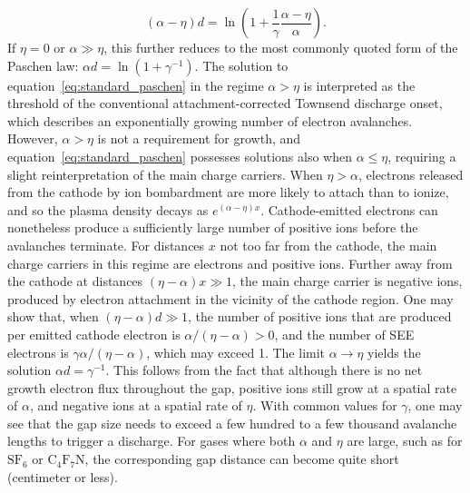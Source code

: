 \documentclass{iopjournal}
\begin{document}
\begin{equation}
  (\alpha-\eta)d = \ln\left(1 + \frac{1}{\gamma}\frac{\alpha-\eta}{\alpha}\right).
\end{equation}
If $\eta = 0$ or $\alpha \gg \eta$, this further reduces to the most commonly quoted form of the Paschen law: $\alpha d = \ln\left(1 + \gamma^{-1}\right)$.
The solution to equation~\eqref{eq:standard_paschen} in the regime $\alpha>\eta$ is interpreted as the threshold of the conventional attachment-corrected Townsend discharge onset, which describes an exponentially growing number of electron avalanches.
However, $\alpha > \eta$ is not a requirement for growth, and equation~\eqref{eq:standard_paschen} possesses solutions also when $\alpha \leq \eta$, requiring a slight reinterpretation of the main charge carriers.
When $\eta>\alpha$, electrons released from the cathode by ion bombardment are more likely to attach than to ionize, and so the plasma density decays as $e^{(\alpha-\eta)x}$.
Cathode-emitted electrons can nonetheless produce a sufficiently large number of positive ions before the avalanches terminate.
For distances $x$ not too far from the cathode, the main charge carriers in this regime are electrons and positive ions.
Further away from the cathode at distances $(\eta-\alpha)x \gg 1$, the main charge carrier is negative ions, produced by electron attachment in the vicinity of the cathode region.
One may show that, when $\left(\eta -\alpha\right)d \gg 1$, the number of positive ions that are produced per emitted cathode electron is $\alpha/(\eta-\alpha) > 0$, and the number of SEE electrons is $\gamma\alpha/(\eta-\alpha)$, which may exceed 1.
The limit $\alpha\rightarrow\eta$ yields the solution $\alpha d = \gamma^{-1}$.
This follows from the fact that although there is no net growth electron flux throughout the gap, positive ions still grow at a spatial rate of $\alpha$, and negative ions at a spatial rate of $\eta$.
With common values for $\gamma$, one may see that the gap size needs to exceed a few hundred to a few thousand avalanche lengths to trigger a discharge.
For gases where both $\alpha$ and $\eta$ are large, such as for $\text{SF}_6$ or $\text{C}_4\text{F}_7\text{N}$, the corresponding gap distance can become quite short (centimeter or less).
\end{document}
